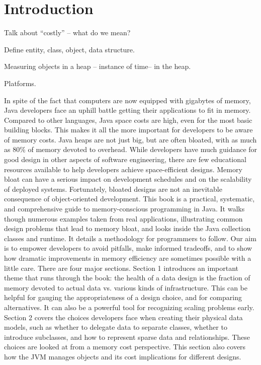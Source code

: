 \chapter{Introduction}


Talk about "`costly"' -- what do we mean?

Define entity, class, object, data structure.  

Measuring objects in a heap -- instance of time-- in the heap.

Platforms.

In spite of the fact that computers are now equipped with gigabytes of memory, Java developers face an uphill battle getting their applications to fit in memory. Compared to other languages, Java space costs are high, even for the most basic building blocks. This makes it all the more important for developers to be aware of memory costs. Java heaps are not just big, but are often bloated, with as much as 80\% of memory devoted to overhead. While developers have much guidance for good design in other aspects of software engineering, there are few educational resources available to help developers achieve space-efficient designs. Memory bloat can have a serious impact on development schedules and on the scalability of deployed systems. Fortunately, bloated designs are not an inevitable consequence of object-oriented development.
This book is a practical, systematic, and comprehensive guide to memory-conscious programming in Java. It walks though numerous examples taken from real applications, illustrating common design problems that lead to memory bloat, and looks inside the Java collection classes and runtime. It details a methodology for programmers to follow. Our aim is to empower developers to avoid pitfalls, make informed tradeoffs, and to show how dramatic improvements in memory efficiency are sometimes possible with a little care. There are four major sections.
Section 1 introduces an important theme that runs through the book: the health of a data design is the fraction of memory devoted to actual data vs. various kinds of infrastructure. This can be helpful for gauging the appropriateness of a design choice, and for comparing alternatives. It can also be a powerful tool for recognizing scaling problems early.
Section 2 covers the choices developers face when creating their physical data models, such as whether to delegate data to separate classes, whether to introduce subclasses, and how to represent sparse data and relationships. These choices are looked at from a memory cost perspective. This section also covers how the JVM manages objects and its cost implications for different designs.  
